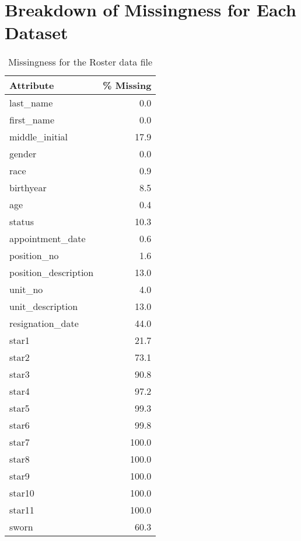 \newpage
\section{Breakdown of Missingness for Each Dataset}\label{sec:missingness}

\begin{table}[h]
	\begin{minipage}[t]{0.48\textwidth}
\centering
\caption{Missingness for the Roster data file}
\begin{tabular}{lr}
\toprule
           Attribute &  \% Missing \\
\midrule
           last\_name &        0.0 \\
          first\_name &        0.0 \\
      middle\_initial &       17.9 \\
              gender &        0.0 \\
                race &        0.9 \\
           birthyear &        8.5 \\
                 age &        0.4 \\
              status &       10.3 \\
    appointment\_date &        0.6 \\
         position\_no &        1.6 \\
position\_description &       13.0 \\
             unit\_no &        4.0 \\
    unit\_description &       13.0 \\
    resignation\_date &       44.0 \\
               star1 &       21.7 \\
               star2 &       73.1 \\
               star3 &       90.8 \\
               star4 &       97.2 \\
               star5 &       99.3 \\
               star6 &       99.8 \\
               star7 &      100.0 \\
               star8 &      100.0 \\
               star9 &      100.0 \\
              star10 &      100.0 \\
              star11 &      100.0 \\
               sworn &       60.3 \\

\end{tabular}
\end{minipage}
\end{table}
